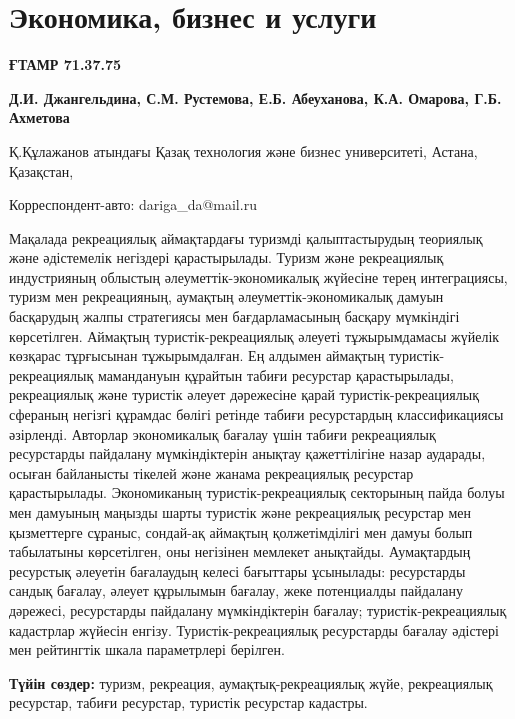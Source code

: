 \let\cleardoublepage\clearpage
\part{Экономика, бизнес и услуги}

{\bfseries ҒТАМР 71.37.75}


\begin{center}
{\bfseries Д.И. Джангельдина, С.М. Рустемова, Е.Б. Абеуханова, К.А. Омарова, Г.Б. Ахметова}

Қ.Құлажанов атындағы Қазақ технология және бизнес университеті, Астана,
Қазақстан,

Корреспондент-авто: dariga\_da@mail.ru
\end{center}

Мақалада рекреациялық аймақтардағы туризмді қалыптастырудың теориялық
және әдістемелік негіздері қарастырылады. Туризм және рекреациялық
индустрияның облыстың әлеуметтік-экономикалық жүйесіне терең
интеграциясы, туризм мен рекреацияның, аумақтың әлеуметтік-экономикалық
дамуын басқарудың жалпы стратегиясы мен бағдарламасының басқару
мүмкіндігі көрсетілген. Аймақтың туристік-рекреациялық әлеуеті
тұжырымдамасы жүйелік көзқарас тұрғысынан тұжырымдалған. Ең алдымен
аймақтың туристік-рекреациялық мамандануын құрайтын табиғи ресурстар
қарастырылады, рекреациялық және туристік әлеует дәрежесіне қарай
туристік-рекреациялық сфераның негізгі құрамдас бөлігі ретінде табиғи
ресурстардың классификациясы әзірленді. Авторлар экономикалық бағалау
үшін табиғи рекреациялық ресурстарды пайдалану мүмкіндіктерін анықтау
қажеттілігіне назар аударады, осыған байланысты тікелей және жанама
рекреациялық ресурстар қарастырылады. Экономиканың туристік-рекреациялық
секторының пайда болуы мен дамуының маңызды шарты туристік және
рекреациялық ресурстар мен қызметтерге сұраныс, сондай-ақ аймақтың
қолжетімділігі мен дамуы болып табылатыны көрсетілген, оны негізінен
мемлекет анықтайды. Аумақтардың ресурстық әлеуетін бағалаудың келесі
бағыттары ұсынылады: ресурстарды сандық бағалау, әлеует құрылымын
бағалау, жеке потенциалды пайдалану дәрежесі, ресурстарды пайдалану
мүмкіндіктерін бағалау; туристік-рекреациялық кадастрлар жүйесін енгізу.
Туристік-рекреациялық ресурстарды бағалау әдістері мен рейтингтік шкала
параметрлері берілген.

{\bfseries Түйін сөздер:} туризм, рекреация, аумақтық-рекреациялық жүйе,
рекреациялық ресурстар, табиғи ресурстар, туристік ресурстар кадастры.

